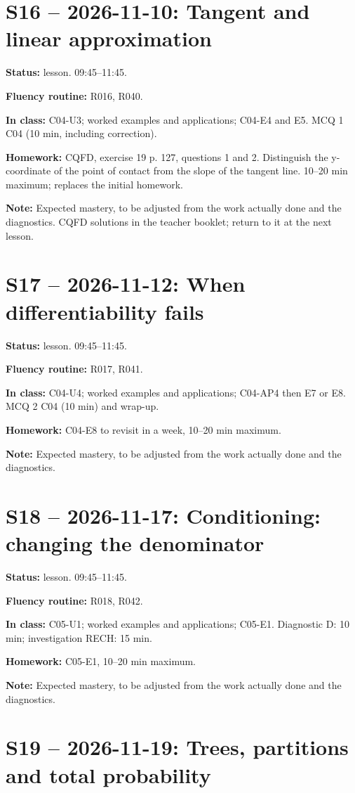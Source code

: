 \section*{S16 -- 2026-11-10: Tangent and linear approximation}
\textbf{Status:} lesson. 09:45–11:45.\par\textbf{Fluency routine:} R016, R040.\par\textbf{In class:} C04-U3; worked examples and applications; C04-E4 and E5.  MCQ 1 C04 (10 min, including correction).\par\textbf{Homework:} CQFD, exercise 19 p. 127, questions 1 and 2. Distinguish the y-coordinate of the point of contact from the slope of the tangent line. 10–20 min maximum; replaces the initial homework.\par\textbf{Note:} Expected mastery, to be adjusted from the work actually done and the diagnostics. CQFD solutions in the teacher booklet; return to it at the next lesson.
\section*{S17 -- 2026-11-12: When differentiability fails}
\textbf{Status:} lesson. 09:45–11:45.\par\textbf{Fluency routine:} R017, R041.\par\textbf{In class:} C04-U4; worked examples and applications; C04-AP4 then E7 or E8.  MCQ 2 C04 (10 min) and wrap-up.\par\textbf{Homework:} C04-E8 to revisit in a week, 10–20 min maximum.\par\textbf{Note:} Expected mastery, to be adjusted from the work actually done and the diagnostics.
\section*{S18 -- 2026-11-17: Conditioning: changing the denominator}
\textbf{Status:} lesson. 09:45–11:45.\par\textbf{Fluency routine:} R018, R042.\par\textbf{In class:} C05-U1; worked examples and applications; C05-E1. Diagnostic D: 10 min; investigation RECH: 15 min.\par\textbf{Homework:} C05-E1, 10–20 min maximum.\par\textbf{Note:} Expected mastery, to be adjusted from the work actually done and the diagnostics.
\section*{S19 -- 2026-11-19: Trees, partitions and total probability}
